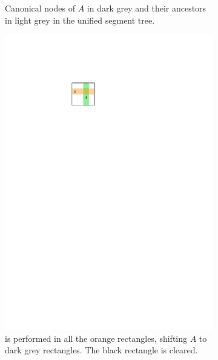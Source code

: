 \documentclass[english,gradu]{tktltiki2018}
\begin{document}
\begin{figure}
\begin{subfigure}[t]{0.4\textwidth}
		\caption{Canonical nodes of $A$ in dark grey and their ancestors in light grey in the unified segment tree.}\label{fig:urm:canon}
	\end{subfigure}
	\hfil
	\begin{subfigure}[t]{0.4\textwidth}\centering
		\includegraphics[width=\textwidth,page=4]{fig/uremove}
		\caption{\pdst is performed in all the orange rectangles, shifting $A$ to dark grey rectangles. The black rectangle is cleared.}\label{fig:urm:push}
	\end{subfigure}
	\hfil
	\begin{subfigure}[t]{0.4\textwidth}\centering

\end{subfigure}
\end{figure}
\end{document}
